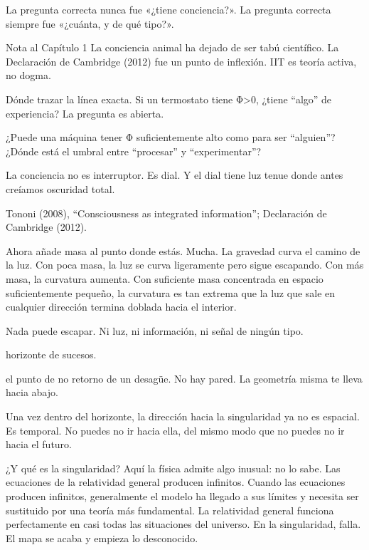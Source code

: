 La pregunta correcta nunca fue «¿tiene conciencia?». La pregunta correcta siempre fue «¿cuánta, y de qué tipo?».

\begin{notacap}{Nota al Capítulo 1}
 La conciencia animal ha dejado de ser tabú científico. La Declaración de Cambridge (2012) fue un punto de inflexión. IIT es teoría activa, no dogma.

 Dónde trazar la línea exacta. Si un termostato tiene Φ>0, ¿tiene “algo” de experiencia? La pregunta es abierta.

 ¿Puede una máquina tener Φ suficientemente alto como para ser “alguien”? ¿Dónde está el umbral entre “procesar” y “experimentar”?

 La conciencia no es interruptor. Es dial. Y el dial tiene luz tenue donde antes creíamos oscuridad total.

 Tononi (2008), “Consciousness as integrated information”; Declaración de Cambridge (2012).
\end{notacap}
\noindent {}

Ahora añade masa al punto donde estás. Mucha. La gravedad curva el camino de la luz. Con poca masa, la luz se curva ligeramente pero sigue escapando. Con más masa, la curvatura aumenta. Con suficiente masa concentrada en espacio suficientemente pequeño, la curvatura es tan extrema que la luz que sale en cualquier dirección termina doblada hacia el interior.

Nada puede escapar. Ni luz, ni información, ni señal de ningún tipo.

\begin{fisica}
 horizonte de sucesos.

 el punto de no retorno de un desagüe. No hay pared. La geometría misma te lleva hacia abajo.
\end{fisica}
\noindent Una vez dentro del horizonte, la dirección hacia la singularidad ya no es espacial. Es temporal. No puedes no ir hacia ella, del mismo modo que no puedes no ir hacia el futuro.

¿Y qué es la singularidad? Aquí la física admite algo inusual: no lo sabe. Las ecuaciones de la relatividad general producen infinitos. Cuando las ecuaciones producen infinitos, generalmente el modelo ha llegado a sus límites y necesita ser sustituido por una teoría más fundamental. La relatividad general funciona perfectamente en casi todas las situaciones del universo. En la singularidad, falla. El mapa se acaba y empieza lo desconocido.

